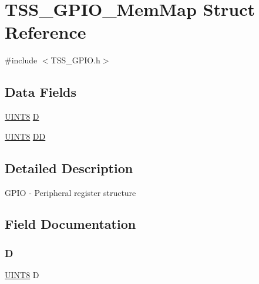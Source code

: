 \hypertarget{struct_t_s_s___g_p_i_o___mem_map}{}\section{T\+S\+S\+\_\+\+G\+P\+I\+O\+\_\+\+Mem\+Map Struct Reference}
\label{struct_t_s_s___g_p_i_o___mem_map}


{\ttfamily \#include $<$T\+S\+S\+\_\+\+G\+P\+I\+O.\+h$>$}

\subsection*{Data Fields}
\begin{DoxyCompactItemize}
\item 
\hyperlink{_t_s_s___data_types_8h_ab27e9918b538ce9d8ca692479b375b6a}{U\+I\+N\+T8} \hyperlink{struct_t_s_s___g_p_i_o___mem_map_a81d8a85955b207c1ea4dcbb39187d5a3}{D}
\item 
\hyperlink{_t_s_s___data_types_8h_ab27e9918b538ce9d8ca692479b375b6a}{U\+I\+N\+T8} \hyperlink{struct_t_s_s___g_p_i_o___mem_map_a7b8270574af15e5165e1c1fda6cac666}{DD}
\end{DoxyCompactItemize}


\subsection{Detailed Description}
G\+P\+IO -\/ Peripheral register structure 

\subsection{Field Documentation}
\mbox{\label{struct_t_s_s___g_p_i_o___mem_map_a81d8a85955b207c1ea4dcbb39187d5a3}} 
\subsubsection{\texorpdfstring{D}{D}}
{\footnotesize\ttfamily \hyperlink{_t_s_s___data_types_8h_ab27e9918b538ce9d8ca692479b375b6a}{U\+I\+N\+T8} D}

\mbox{\label{struct_t_s_s___g_p_i_o___mem_map_a7b8270574af15e5165e1c1fda6cac666}} 
